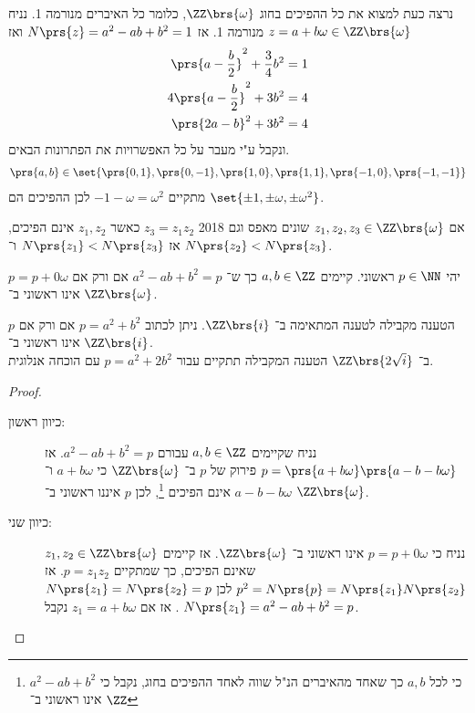 \documentclass[a4paper,10pt,twoside,openany]{book}
\begin{document}
נרצה כעת למצוא את כל ההפיכים בחוג
$\ZZ\brs{\omega}$,
כלומר כל האיברים מנורמה 1.
נניח
$z = a+b\omega \in \ZZ\brs{\omega}$
מנורמה 1. אז
$N\prs{z} = a^2 - ab + b^2 = 1$
ואז
\begin{align*}
\prs{a-\frac{b}{2}}^2 + \frac{3}{4}b^2 &= 1 \\
4\prs{a-\frac{b}{2}}^2 + 3b^2 &= 4 \\
\prs{2a-b}^2 + 3b^2 &= 4
\end{align*}
ונקבל ע"י מעבר על כל האפשרויות את הפתרונות הבאים.
\begin{align*}
\prs{a,b} \in \set{\prs{0,1},\prs{0,-1}, \prs{1,0}, \prs{1,1}, \prs{-1,0}, \prs{-1,-1}}
\end{align*}
מתקיים
$-1-\omega = \omega^2$
לכן ההפיכים הם
$\set{\pm 1, \pm \omega, \pm \omega^2}$.

\begin{corollary}
אם
$z_1, z_2, z_3 \in \ZZ\brs{\omega}$
שונים מאפס וגם%
%
{2018}
$z_3 = z_1 z_2$
כאשר
$z_1, z_2$
אינם הפיכים, אז
$N\prs{z_1} < N\prs{z_3}$
ו־%
$N\prs{z_2} < N\prs{z_3}$.
\end{corollary}
\begin{proposition}
יהי
$p \in \NN$
ראשוני. קיימים
$a,b \in \ZZ$
כך ש־%
$a^2 - ab + b^2 = p$
אם ורק אם
$p = p+0\omega$
אינו ראשוני ב־%
$\ZZ\brs{\omega}$.
\end{proposition}
\begin{remark}
הטענה מקבילה לטענה המתאימה ב־%
$\ZZ\brs{i}$.
ניתן לכתוב
$p = a^2 + b^2$
אם ורק אם
$p$
אינו ראשוני ב־%
$\ZZ\brs{i}$.\\
ב־%
$\ZZ\brs{2\sqrt{i}}$
הטענה המקבילה תתקיים עבור
$p = a^2 + 2b^2$
עם הוכחה אנלוגית.
\end{remark}
\begin{proof}
\begin{description}
\item[כיוון ראשון:]
נניח שקיימים
$a,b \in \ZZ$
עבורם
$a^2 - ab + b^2 = p$.
אז
$p=\prs{a+b\omega}\prs{a-b-b\omega}$
פירוק של
$p$
ב־%
$\ZZ\brs{\omega}$
כי
$a+b\omega$
ו־%
$a-b-b\omega$
אינם הפיכים%
\footnote{כי לכל
$a,b$
כך שאחד מהאיברים הנ"ל שווה לאחד ההפיכים בחוג, נקבל כי
$a^2 - ab + b^2$
אינו ראשוני ב־%
$\ZZ$},
לכן
$p$
איננו ראשוני ב־%
$\ZZ\brs{\omega}$.
\item[כיוון שני:]
נניח כי
$p = p+0\omega$
אינו ראשוני ב־%
$\ZZ\brs{\omega}$.
אז קיימים
$z_1, z_2 \in \ZZ\brs{\omega}$
שאינם הפיכים, כך שמתקיים
$p = z_1 z_2$.
אז
$p^2 = N\prs{p} = N\prs{z_1} N\prs{z_2}$
לכן
$N\prs{z_1} = N\prs{z_2} = p$.
אז אם
$z_1 = a+b\omega$
נקבל
$N\prs{z_1} = a^2 - ab + b^2 = p$.
\end{description}
\end{proof}
\end{document}
